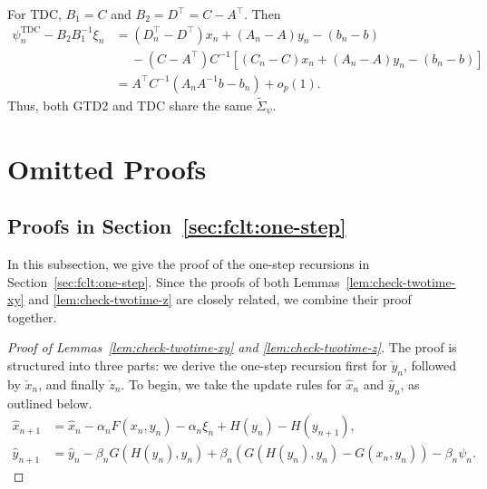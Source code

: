 \documentclass[11pt]{article}
\theoremstyle{plain}
\theoremstyle{definition}
\newcommand{\xhat}{{\hat{x}}}
\newcommand{\yhat}{{\hat{y}}}
\newcommand{\xcheck}{{\check{x}}}
\newcommand{\ycheck}{{\check{y}}}
\newcommand{\zcheck}{{\check{z}}}
\def\psia{\psi^{\mathrm{GTD2}}}
\def\psib{\psi^{\mathrm{TDC}}}
\begin{document}
\begin{appendix}
For TDC, $B_1 = C$ and $B_2 = D^\top = C-A^\top$.
Then
\begin{align*}
\psib_{n} - B_2 B_1^{-1}\xi_{n} 
& = (D_n^\top {-} D^\top) x_{n} + (A_{n} {-} A ) y_{n} - (b_{n} {-} b) \\
& \quad  \ - (C - A^\top) C^{-1} [ (C_n {-} C) x_{n} + (A_n {-} A)y_{n} - (b_{n} {-} b) ] \\
& = A^\top C^{-1} ( A_{n} A^{-1} b - b_{n} ) + o_p(1).
\end{align*}
Thus, both GTD2 and TDC share the same $\widetilde{\Sigma}_{\psi}$.




\section{Omitted Proofs}

\subsection{Proofs in Section~\ref{sec:fclt:one-step}}
\label{sec:fclt:proof:construct}
In this subsection, we give the proof of the one-step recursions in Section~\ref{sec:fclt:one-step}.
Since the proofs of both Lemmas~\ref{lem:check-twotime-xy} and \ref{lem:check-twotime-z} are closely related, we combine their proof together.
\begin{proof}[Proof of Lemmas~\ref{lem:check-twotime-xy} and \ref{lem:check-twotime-z}]
The proof is structured into three parts:  we derive the one-step recursion first for $\ycheck_{n}$, followed by $\xcheck_{n}$, and finally $\zcheck_{n}$.
To begin, we take the update rules for $\xhat_{n}$ and $\yhat_{n}$, as outlined below.
\begin{align}
    \xhat_{n+1} & = \xhat_n - \alpha_n F(x_n, y_n) - \alpha_n \xi_n + H(y_n) - H(y_{n+1}), \label{eq:xhat} \\
    \yhat_{n+1} & = \yhat_n - \beta_n G(H(y_n), y_n) + \beta_n ( G(H(y_n), y_n) - G(x_n, y_n) ) - \beta_n \psi_n. \label{eq:yhat}
\end{align}


\end{proof}
\end{appendix}
\end{document}
